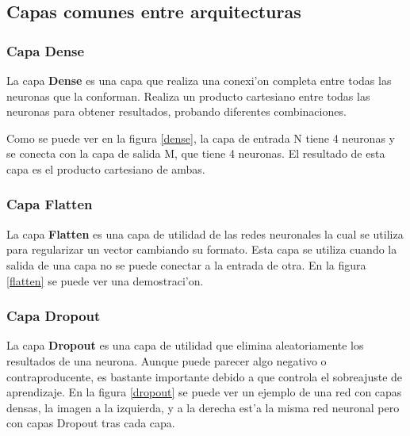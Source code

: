 
\clearpage

\subsection{Capas comunes entre arquitecturas}

\subsubsection{Capa Dense}

La capa \textbf{Dense} es una capa que realiza una conexi'on completa entre todas las neuronas que la conforman. Realiza un producto cartesiano entre todas las neuronas para obtener resultados, probando diferentes combinaciones. 


Como se puede ver en la figura \ref{dense}, la capa de entrada N tiene 4 neuronas y se conecta con la capa de salida M, que tiene 4 neuronas. El resultado de esta capa es el producto cartesiano de ambas.


\subsubsection{Capa Flatten}

La capa \textbf{Flatten} es una capa de utilidad de las redes neuronales la cual se utiliza para regularizar un vector cambiando su formato. Esta capa se utiliza cuando la salida de una capa no se puede conectar a la entrada de otra.  
En la figura \ref{flatten} se puede ver una demostraci'on.



\subsubsection{Capa Dropout}

La capa \textbf{Dropout} es una capa de utilidad que elimina aleatoriamente los resultados de una neurona. Aunque puede parecer algo negativo o contraproducente, es bastante importante debido a que controla el sobreajuste de aprendizaje.
En la figura \ref{dropout} se puede ver un ejemplo de una red con capas densas, la imagen a la izquierda, y a la derecha est'a la misma red neuronal pero con capas Dropout tras cada capa.

